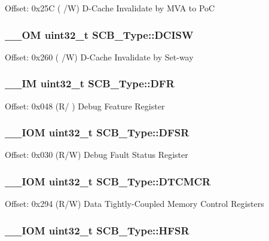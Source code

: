 Offset\-: 0x25\-C ( /\-W) D-\/\-Cache Invalidate by M\-V\-A to Po\-C \hypertarget{struct_s_c_b___type_a22bcfd7e1bffebdbe98cdbc8d77a2f42}{
\subsubsection[{D\-C\-I\-S\-W}]{\setlength{\rightskip}{0pt plus 5cm}\-\_\-\-\_\-\-O\-M uint32\-\_\-t S\-C\-B\-\_\-\-Type\-::\-D\-C\-I\-S\-W}}\label{struct_s_c_b___type_a22bcfd7e1bffebdbe98cdbc8d77a2f42}
Offset\-: 0x260 ( /\-W) D-\/\-Cache Invalidate by Set-\/way \hypertarget{struct_s_c_b___type_a85dd6fe77aab17e7ea89a52c59da6004}{
\subsubsection[{D\-F\-R}]{\setlength{\rightskip}{0pt plus 5cm}\-\_\-\-\_\-\-I\-M uint32\-\_\-t S\-C\-B\-\_\-\-Type\-::\-D\-F\-R}}\label{struct_s_c_b___type_a85dd6fe77aab17e7ea89a52c59da6004}
Offset\-: 0x048 (R/ ) Debug Feature Register \hypertarget{struct_s_c_b___type_a191579bde0d21ff51d30a714fd887033}{
\subsubsection[{D\-F\-S\-R}]{\setlength{\rightskip}{0pt plus 5cm}\-\_\-\-\_\-\-I\-O\-M uint32\-\_\-t S\-C\-B\-\_\-\-Type\-::\-D\-F\-S\-R}}\label{struct_s_c_b___type_a191579bde0d21ff51d30a714fd887033}
Offset\-: 0x030 (R/\-W) Debug Fault Status Register \hypertarget{struct_s_c_b___type_a2836e932734240076ce91cf4484cdf43}{
\subsubsection[{D\-T\-C\-M\-C\-R}]{\setlength{\rightskip}{0pt plus 5cm}\-\_\-\-\_\-\-I\-O\-M uint32\-\_\-t S\-C\-B\-\_\-\-Type\-::\-D\-T\-C\-M\-C\-R}}\label{struct_s_c_b___type_a2836e932734240076ce91cf4484cdf43}
Offset\-: 0x294 (R/\-W) Data Tightly-\/\-Coupled Memory Control Registers \hypertarget{struct_s_c_b___type_a14ad254659362b9752c69afe3fd80934}{
\subsubsection[{H\-F\-S\-R}]{\setlength{\rightskip}{0pt plus 5cm}\-\_\-\-\_\-\-I\-O\-M uint32\-\_\-t S\-C\-B\-\_\-\-Type\-::\-H\-F\-S\-R}}\label{struct_s_c_b___type_a14ad254659362b9752c69afe3fd80934}

